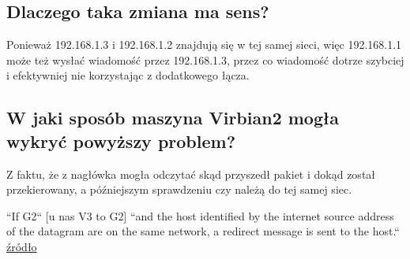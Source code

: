 \documentclass{article}
\begin{document}
\subsection{Dlaczego taka zmiana ma sens?}
Ponieważ 192.168.1.3 i 192.168.1.2 znajdują się w tej samej sieci, więc 192.168.1.1 może też wysłać wiadomość przez 192.168.1.3, przez co wiadomość dotrze szybciej i efektywniej nie korzystając z dodatkowego łącza.
\subsection{W jaki sposób maszyna Virbian2 mogła wykryć powyższy problem?}
Z faktu, że z nagłówka mogła odczytać skąd przyszedł pakiet i dokąd został przekierowany, a późniejszym sprawdzeniu czy należą do tej samej siec.

``If G2`` [u nas V3 to G2] ``and the host identified by the internet source address of the datagram are on the same network, a redirect message is sent to the host.`` \href{https://www.cisco.com/c/en/us/support/docs/ios-nx-os-software/nx-os-software/213841-understanding-icmp-redirect-messages.html}{źródło}
\end{document}

